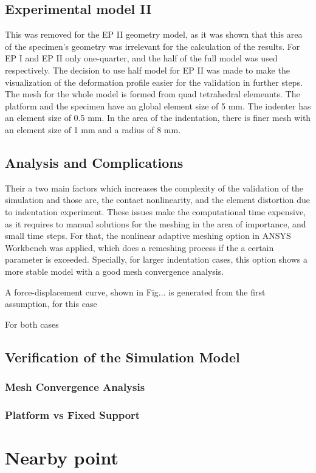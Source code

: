 \subsection*{Experimental model II}
This was removed for the EP II geometry model, as it was shown that this area 
of the specimen's geometry was irrelevant for the calculation of the results.
For EP I and EP II only one-quarter, and the half of the full model was used respectively.
The decision to use half model for EP II was made to make the visualization of the deformation profile 
easier for the validation in further steps.\\

The mesh for the whole model is formed from quad tetrahedral elemennts. The platform and 
the specimen have an global element size of 5 mm. The indenter has an element size of
0.5 mm. In the area of the indentation, there is finer mesh with an element size of
1 mm and a radius of 8 mm. 

\subsection{Analysis and Complications}
Their a two main factors which increases the complexity of the validation of the simulation
and those are, the contact nonlinearity, and the element distortion due to indentation
 experiment. These issues make the computational time expensive, as it requires to manual 
 solutions for the meshing in the area of importance, and small time steps. 
 For that, 
 the nonlinear adaptive meshing option in ANSYS Workbench was applied, which does a remeshing
 process if the a certain parameter is exceeded.%
Specially, for larger indentation cases, this option shows a more stable model with a 
good mesh convergence analysis.

A force-displacement curve, shown in Fig... is generated from the first assumption, 
for this case 

For both cases 

\subsection{Verification of the Simulation Model}

\subsubsection*{Mesh Convergence Analysis}
\subsubsection*{Platform vs Fixed Support}


\section{Nearby point}


